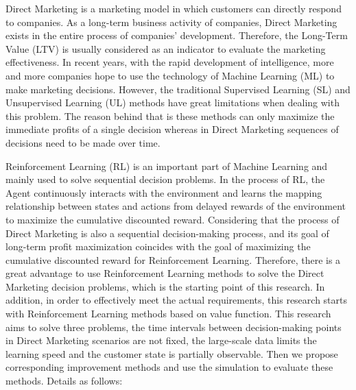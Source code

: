 \begin{enabstract}

Direct Marketing is a marketing model in which customers can directly respond to companies. As a long-term business activity of companies, Direct Marketing exists in the entire process of companies' development. Therefore, the Long-Term Value (LTV) is usually considered as an indicator to evaluate the marketing effectiveness. In recent years, with the rapid development of intelligence, more and more companies hope to use the technology of Machine Learning (ML) to make marketing decisions. However, the traditional Supervised Learning (SL) and Unsupervised Learning (UL) methods have great limitations when dealing with this problem. The reason behind that is these methods can only maximize the immediate profits of a single decision whereas in Direct Marketing sequences of decisions need to be made over time.

Reinforcement Learning (RL) is an important part of Machine Learning and mainly used to solve sequential decision problems. In the process of RL, the Agent continuously interacts with the environment and learns the mapping relationship between states and actions from delayed rewards of the environment to maximize the cumulative discounted reward. Considering that the process of Direct Marketing is also a sequential decision-making process, and its goal of long-term profit maximization coincides with the goal of maximizing the cumulative discounted reward for Reinforcement Learning. Therefore, there is a great advantage to use Reinforcement Learning methods to solve the Direct Marketing decision problems, which is the starting point of this research. In addition, in order to effectively meet the actual requirements, this research starts with Reinforcement Learning methods based on value function. This research aims to solve three problems, the time intervals between decision-making points in Direct Marketing scenarios are not fixed, the large-scale data limits the learning speed and the customer state is partially observable. Then we propose corresponding improvement methods and use the simulation to evaluate these methods. Details as follows:


\end{enabstract}
